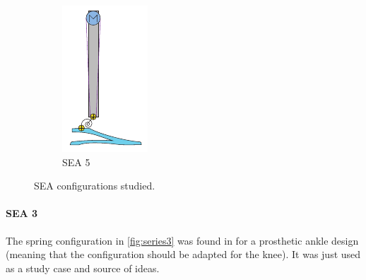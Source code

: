 \begin{figure}[htb]
\begin{subfigure}{.19\textwidth}
    \includegraphics[width=\linewidth]{figures/illustration_serial_rotational.pdf}
    \caption{SEA 5}
    \label{fig:series5}
  \end{subfigure}
  \caption{SEA configurations studied.}
  \label{fig:compliance_series}
\end{figure}  

\paragraph{SEA 3} %
\label{par:sea_3}
The spring configuration in \ref{fig:series3} was found in \cite{grimmer} for a prosthetic ankle design (meaning that the configuration should be adapted for the knee).
It was just used as a study case and source of ideas. 

